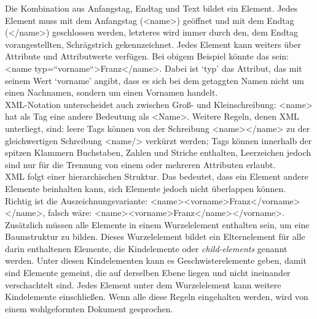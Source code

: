 \documentclass{article}
\begin{document}
        Die Kombination aus Anfangstag, Endtag und Text bildet ein Element. Jedes Element
                  muss mit dem Anfangstag (<name>) geöffnet und mit dem Endtag
                     (</name>) geschlossen werden, letzteres wird immer durch
                  den, dem Endtag vorangestellten, Schrägstrich gekennzeichnet. Jedes Element kann
                  weiters über Attribute und Attributwerte verfügen. Bei obigem Beispiel könnte das
                  sein: <name typ=“vorname“>Franz</name>.
                  Dabei ist ‘typ’ das Attribut, das mit seinem Wert ‘vorname’ angibt, dass es sich
                  bei dem getaggten Namen nicht um einen Nachnamen, sondern um einen Vornamen
                  handelt. \\
            
        XML-Notation unterscheidet auch zwischen Groß- und Kleinschreibung:
                     <name> hat als Tag eine andere Bedeutung als
                     <Name>. Weitere Regeln, denen XML unterliegt, sind: leere
                  Tags können von der Schreibung <name></name> zu der
                  gleichwertigen Schreibung <name/> verkürzt werden; Tags können
                  innerhalb der spitzen Klammern Buchstaben, Zahlen und Striche enthalten,
                  Leerzeichen jedoch sind nur für die Trennung von einem oder mehreren Attributen
                  erlaubt.\\
            
        XML folgt einer hierarchischen Struktur. Das bedeutet, dass ein Element andere
                  Elemente beinhalten kann, sich Elemente jedoch nicht überlappen können. \\
            
        Richtig ist die Auszeichnungsvariante:
                     <name><vorname>Franz</vorname></name>,
                  falsch wäre:
                     <name><vorname>Franz</name></vorname>.
                  Zusätzlich müssen alle Elemente in einem Wurzelelement enthalten sein, um eine
                  Baumstruktur zu bilden. Dieses Wurzelelement bildet ein Elternelement für alle
                  darin enthaltenen Elemente, die Kindelemente oder \emph{child-elements} genannt werden. Unter diesen Kindelementen kann es
                  Geschwisterelemente geben, damit sind Elemente gemeint, die auf derselben Ebene
                  liegen und nicht ineinander verschachtelt sind. Jedes Element unter dem
                  Wurzelelement kann weitere Kindelemente einschließen. Wenn alle diese Regeln
                  eingehalten werden, wird von einem wohlgeformten Dokument gesprochen.\\
            
\end{document}
